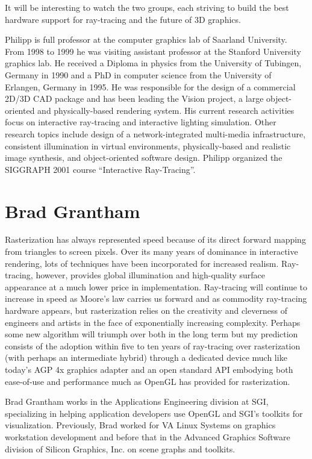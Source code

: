 \documentclass{acmsiggraph}
\begin{document}
It will be interesting to watch the two groups, each striving to build
the best hardware support for ray-tracing and the future of 3D
graphics.
\newline

Philipp is full professor at the computer graphics lab of
Saarland University. From 1998 to 1999 he was visiting assistant
professor at the Stanford University graphics lab. He received a
Diploma in physics from the University of Tubingen, Germany in 1990
and a PhD in computer science from the University of Erlangen, Germany
in 1995.  He was responsible for the design of a commercial 2D/3D CAD
package and has been leading the Vision project, a large
object-oriented and physically-based rendering system. His current
research activities focus on interactive ray-tracing and interactive
lighting simulation. Other research topics
include design of a network-integrated multi-media infrastructure,
consistent illumination in virtual environments, physically-based and
realistic image synthesis, and object-oriented software design.
Philipp organized the SIGGRAPH 2001 course ``Interactive Ray-Tracing''.

\section{Brad Grantham}

Rasterization has always represented speed because of its direct
forward mapping from triangles to screen pixels.  Over its many years
of dominance in interactive rendering, lots of techniques have been
incorporated for increased realism.  Ray-tracing, however, provides
global illumination and high-quality surface appearance at a much
lower price in implementation.  Ray-tracing will continue to increase
in speed as Moore's law carries us forward and as commodity
ray-tracing hardware appears, but rasterization relies on the
creativity and cleverness of engineers and artists in the face of
exponentially increasing complexity.  Perhaps some new algorithm will
triumph over both in the long term but my prediction consists of the
adoption within five to ten years of ray-tracing over rasterization
(with perhaps an intermediate hybrid) through a dedicated device much
like today's AGP 4x graphics adapter and an open standard API
embodying both ease-of-use and performance much as OpenGL has provided
for rasterization.
\newline

Brad Grantham works in the Applications Engineering division at SGI,
specializing in helping application developers use OpenGL and SGI's
toolkits for visualization.  Previously, Brad worked for VA Linux
Systems on graphics workstation development and before that in the
Advanced Graphics Software division of Silicon Graphics, Inc. on scene
graphs and toolkits.
\end{document}

